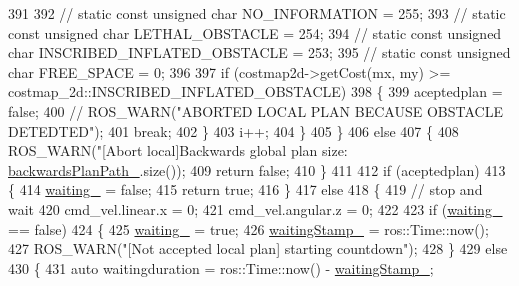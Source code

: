 \begin{DoxyCode}
{{391 
392             \textcolor{comment}{// static const unsigned char NO\_INFORMATION = 255;}
393             \textcolor{comment}{// static const unsigned char LETHAL\_OBSTACLE = 254;}
394             \textcolor{comment}{// static const unsigned char INSCRIBED\_INFLATED\_OBSTACLE = 253;}
395             \textcolor{comment}{// static const unsigned char FREE\_SPACE = 0;}
396 
397             \textcolor{keywordflow}{if} (costmap2d->getCost(mx, my) >= costmap\_2d::INSCRIBED\_INFLATED\_OBSTACLE)
398             \{
399                 aceptedplan = \textcolor{keyword}{false};
400                 \textcolor{comment}{// ROS\_WARN("ABORTED LOCAL PLAN BECAUSE OBSTACLE DETEDTED");}
401                 \textcolor{keywordflow}{break};
402             \}
403             i++;
404         \}
405     \}
406     \textcolor{keywordflow}{else}
407     \{
408         ROS\_WARN(\textcolor{stringliteral}{"[Abort local]Backwards global plan size: %
      \hyperlink{classmove__base__z__client_1_1backward__local__planner_1_1BackwardLocalPlanner_a451add2af7d6d83a7415277311b3ed04}{backwardsPlanPath\_}.size());
409         \textcolor{keywordflow}{return} \textcolor{keyword}{false};
410     \}
411 
412     \textcolor{keywordflow}{if} (aceptedplan)
413     \{
414         \hyperlink{classmove__base__z__client_1_1backward__local__planner_1_1BackwardLocalPlanner_a6969156ab6f82e03418987af4c5bd589}{waiting\_} = \textcolor{keyword}{false};
415         \textcolor{keywordflow}{return} \textcolor{keyword}{true};
416     \}
417     \textcolor{keywordflow}{else}
418     \{
419         \textcolor{comment}{// stop and wait}
420         cmd\_vel.linear.x = 0;
421         cmd\_vel.angular.z = 0;
422 
423         \textcolor{keywordflow}{if} (\hyperlink{classmove__base__z__client_1_1backward__local__planner_1_1BackwardLocalPlanner_a6969156ab6f82e03418987af4c5bd589}{waiting\_} == \textcolor{keyword}{false})
424         \{
425             \hyperlink{classmove__base__z__client_1_1backward__local__planner_1_1BackwardLocalPlanner_a6969156ab6f82e03418987af4c5bd589}{waiting\_} = \textcolor{keyword}{true};
426             \hyperlink{classmove__base__z__client_1_1backward__local__planner_1_1BackwardLocalPlanner_aea0e5312bd482daafc0b8779efaf56a0}{waitingStamp\_} = ros::Time::now();
427             ROS\_WARN(\textcolor{stringliteral}{"[Not accepted local plan] starting countdown"});
428         \}
429         \textcolor{keywordflow}{else}
430         \{
431             \textcolor{keyword}{auto} waitingduration = ros::Time::now() - \hyperlink{classmove__base__z__client_1_1backward__local__planner_1_1BackwardLocalPlanner_aea0e5312bd482daafc0b8779efaf56a0}{waitingStamp\_};
}}}
\end{DoxyCode}
